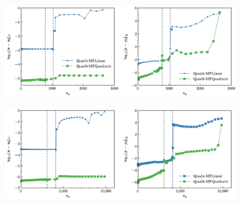 \begin{figure}[H]
\begin{subcaptiongroup}
    \label{cantilever_8_L2_p}
    \end{subcaptiongroup}
    \begin{subcaptiongroup}
    \includegraphics[width=0.45\textwidth]{figures/ch_4/cantilever_16_L2_u.png}
    \label{cantilever_16_L2_u}
    \includegraphics[width=0.45\textwidth]{figures/ch_4/cantilever_16_L2_p.png}
    \label{cantilever_16_L2_p}
    \end{subcaptiongroup}
    \begin{subcaptiongroup}
    \includegraphics[width=0.45\textwidth]{figures/ch_4/cantilever_32_L2_u.png}
    \label{cantilever_32_L2_u}
    \includegraphics[width=0.45\textwidth]{figures/ch_4/cantilever_32_L2_p.png}

\end{subcaptiongroup}
\end{figure}
